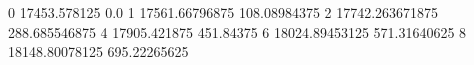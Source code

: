 0 17453.578125 0.0
1 17561.66796875 108.08984375
2 17742.263671875 288.685546875
4 17905.421875 451.84375
6 18024.89453125 571.31640625
8 18148.80078125 695.22265625
